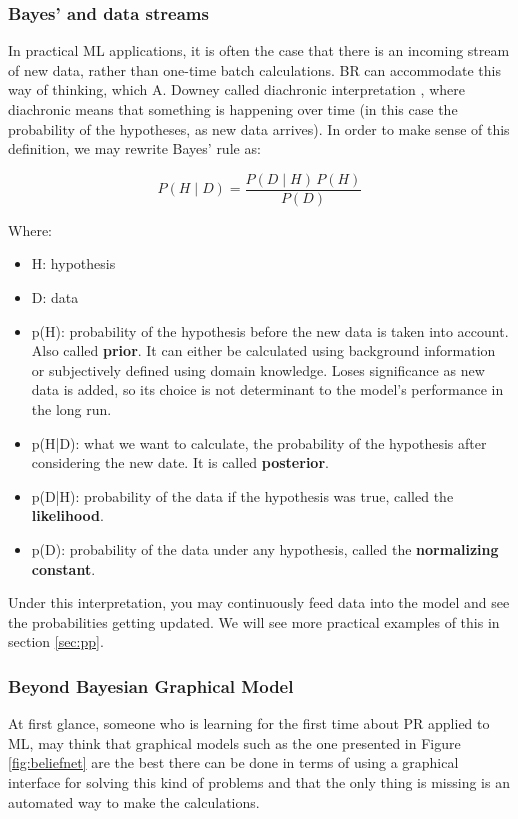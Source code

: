\subsubsection{Bayes' and data streams}

In practical ML applications, it is often the case that there is an
incoming stream of new data, rather than one-time batch calculations.
BR can accommodate this way of thinking, which A. Downey called diachronic
interpretation \cite{thbay}, where diachronic means that something is happening
over time (in this case the probability of the hypotheses, as new data arrives).
In order to make sense of this definition, we may rewrite Bayes' rule as:

$$ P(H \mid D) = \frac{P(D \mid H) \, P(H)}{P(D)} $$

Where:

\begin{itemize}
  \item H: hypothesis
  \item D: data
  \item p(H): probability of the hypothesis before the new data is taken into
account. Also called \textbf{prior}. It can either be calculated using background
information or subjectively defined using domain knowledge. Loses significance
as new data is added, so its choice is not determinant to the model's performance
in the long run.
  \item p(H|D): what we want to calculate, the probability of the hypothesis
after considering the new date. It is called \textbf{posterior}.
  \item p(D|H): probability of the data if the hypothesis was true, called
the \textbf{likelihood}.
  \item p(D): probability of the data under any hypothesis, called the
\textbf{normalizing constant}.
\end{itemize}

Under this interpretation, you may continuously feed data into the model and see
the probabilities getting updated. We will see more practical examples of this
in section \ref{sec:pp}.

\subsubsection{Beyond Bayesian Graphical Model}

At first glance, someone who is learning for the first time about PR applied
to ML, may think that graphical models such as the one presented in Figure
\ref{fig:beliefnet} are the best there can be done in terms of using a graphical
interface for solving this kind of problems and that the only thing is missing
is an automated way to make the calculations.

